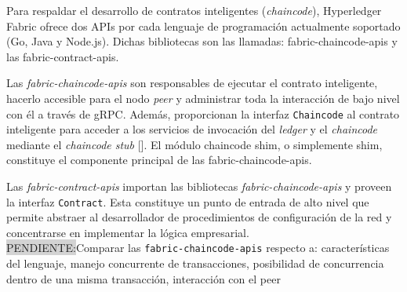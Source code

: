Para respaldar el desarrollo de contratos inteligentes (\textit{chaincode}), Hyperledger Fabric ofrece dos APIs por cada lenguaje de programación actualmente soportado (Go, Java y Node.js). Dichas bibliotecas son las llamadas: fabric-chaincode-apis y las fabric-contract-apis.

Las \textit{fabric-chaincode-apis} son responsables de ejecutar el contrato inteligente, hacerlo accesible para el nodo \textit{peer} y administrar toda la interacción de bajo nivel con él a través de gRPC. Además, proporcionan la interfaz  \texttt{Chaincode} al contrato inteligente para acceder a los servicios de invocación del \textit{ledger} y el \textit{chaincode} mediante el \textit{chaincode stub} [\cite{hlf-internals}]. El módulo chaincode shim, o simplemente shim, constituye el componente principal de las fabric-chaincode-apis.

Las \textit{fabric-contract-apis} importan las bibliotecas \textit{fabric-chaincode-apis }y  proveen la interfaz \texttt{Contract}. Esta constituye un punto de entrada de alto nivel que permite abstraer al desarrollador de procedimientos de configuración de la red y concentrarse en implementar la lógica empresarial.\\
%

\colorbox{lightgray}{PENDIENTE:}Comparar las \texttt{fabric-chaincode-apis} respecto a: características del lenguaje, manejo concurrente de transacciones, posibilidad de concurrencia dentro de una misma transacción, interacción con el peer


%









